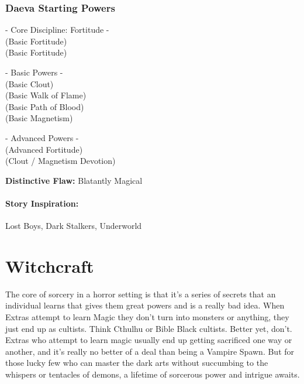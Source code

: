 \subsubsection{Daeva Starting Powers}

\hspace{\parindent} - Core Discipline: Fortitude -\\
 (Basic Fortitude)\\
 (Basic Fortitude)

- Basic Powers -\\
 (Basic Clout)\\
 (Basic Walk of Flame)\\
 (Basic Path of Blood)\\
 (Basic Magnetism)

- Advanced Powers -\\
 (Advanced Fortitude)\\
 (Clout / Magnetism Devotion)

\textbf{Distinctive Flaw:} Blatantly Magical

\paragraph{Story Inspiration:} Lost Boys, Dark Stalkers, Underworld

\section{Witchcraft} 

The core of sorcery in a horror setting is that it's a series of secrets that an individual learns that gives them great powers and is a really bad idea. When Extras attempt to learn Magic they don't turn into monsters or anything, they just end up as cultists. Think Cthulhu or Bible Black cultists. Better yet, don't. Extras who attempt to learn magic usually end up getting sacrificed one way or another, and it's really no better of a deal than being a Vampire Spawn. But for those lucky few who can master the dark arts without succumbing to the whispers or tentacles of demons, a lifetime of sorcerous power and intrigue awaits. 

